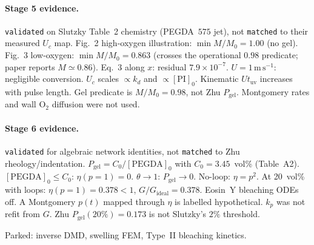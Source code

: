 \documentclass[11pt,a4paper]{article}
\newcommand{\tagmatch}{\texttt{matched}}
\begin{document}
\paragraph{Stage 5 evidence.}
\texttt{validated} on Slutzky Table~2 chemistry (PEGDA~$575$ jet), not \tagmatch{} to their measured $U_c$ map.
Fig.~2 high-oxygen illustration: $\min M/M_0=1.00$ (no gel).
Fig.~3 low-oxygen: $\min M/M_0=0.863$ (crosses the operational $0.98$ predicate; paper reports $M\simeq 0.86$).
Eq.~3 along $x$: residual $7.9\times 10^{-7}$.
$U=1\,\mathrm{m\,s^{-1}}$: negligible conversion.
$U_c$ scales $\propto k_d$ and $\propto[\mathrm{PI}]_0$.
Kinematic $U t_{\mathrm{uv}}$ increases with pulse length.
Gel predicate is $M/M_0=0.98$, not Zhu $P_{\mathrm{gel}}$.
Montgomery rates and wall $\mathrm{O}_2$ diffusion were not used.

\paragraph{Stage 6 evidence.}
\texttt{validated} for algebraic network identities, not \tagmatch{} to Zhu rheology/indentation.
$P_{\mathrm{gel}}=C_0/[\mathrm{PEGDA}]_0$ with $C_0=3.45$~vol\% (Table~A2).
$[\mathrm{PEGDA}]_0\le C_0$: $\eta(p=1)=0$.
$\theta\to 1$: $P_{\mathrm{gel}}\to 0$.
No-loop: $\eta=p^2$.
At 20~vol\% with loops: $\eta(p=1)=0.378<1$, $G/G_{\mathrm{ideal}}=0.378$.
Eosin~Y bleaching ODEs off.
A Montgomery $p(t)$ mapped through $\eta$ is labelled hypothetical.
$k_p$ was not refit from $G$.
Zhu $P_{\mathrm{gel}}(20\%)=0.173$ is not Slutzky's $2\%$ threshold.

Parked: inverse DMD, swelling FEM, Type~II bleaching kinetics.



\end{document}
